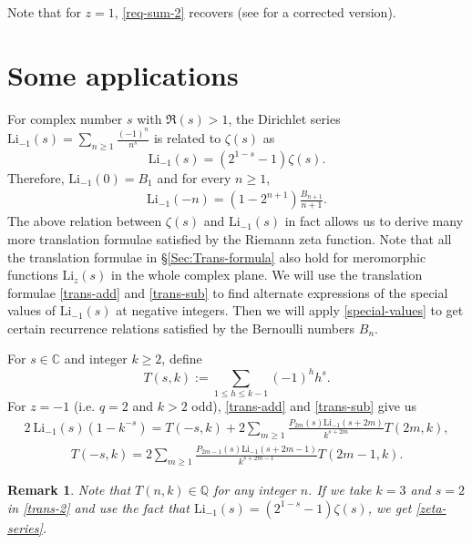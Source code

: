 \documentclass[12pt]{amsart}
\newcommand{\Q}{{\mathbb Q}}
\newcommand{\C}{{\mathbb C}}
\newtheorem{rmk}{Remark}
\begin{document}
Note that for $z=1$, \eqref{req-sum-2} recovers \cite[eq. (15)]{TA} (see \cite[eq. (2.15)]{LOC} for a corrected version).




\section{Some applications}
For complex number $s$ with $\Re(s)>1$, the Dirichlet series  $\mathrm{Li}_{-1}(s)=\sum_{n\ge 1}\frac{(-1)^{n}}{n^s}$ 
is related to $\zeta(s)$ as
 $$
 \mathrm{Li}_{-1}(s)=(2^{1-s}-1)\zeta(s).
 $$
Therefore, $\mathrm{Li}_{-1}(0)=B_1$ and for every $n\geq1$,
\begin{align}\label{special-values}
\mathrm{Li}_{-1}(-n)=(1-2^{n+1})\frac{B_{n+1}}{n+1}.
\end{align}
The above relation between $\zeta(s)$ and $\mathrm{Li}_{-1}(s)$ in fact allows us to derive many more
translation formulae satisfied by the Riemann zeta function.
Note that all the translation formulae in \S\ref{Sec:Trans-formula} also hold for meromorphic functions $\mathrm{Li}_z(s)$ in the whole complex plane.
We will use the translation formulae \eqref{trans-add} and \eqref{trans-sub} to find alternate expressions of the special values of $\mathrm{Li}_{-1}(s)$ at negative 
integers. Then we will apply \eqref{special-values} to get certain recurrence relations satisfied by the Bernoulli numbers $B_n$.

 For $s\in \C$ and integer $k\geq2$, define
 $$
 T(s,k):=\sum_{1\leq h\leq k-1}(-1)^hh^s.
 $$
For $z=-1$ (i.e. $q=2$ and $k>2$ odd), \eqref{trans-add} and \eqref{trans-sub} give us
\begin{align}\label{trans-1}
2 \ \mathrm{Li}_{-1}(s)(1-k^{-s})=T(-s,k)+2\sum_{m\ge1}\frac{P_{2m}(s)
\mathrm{Li}_{-1}(s+2m)}{k^{{s+2m}}}T(2m,k),
\end{align}
\begin{align}\label{trans-2}
T(-s,k)=2\sum_{m\ge1}\frac{P_{2m-1}(s)\mathrm{Li}_{-1}(s+2m-1)}{k^{{s+2m-1}}}T(2m-1,k).
\end{align}

\begin{rmk}\rm
Note that $T(n,k)\in \Q$ for any integer $n$. If we take $k=3$ and $s=2$ in \eqref{trans-2} and use the fact that $\mathrm{Li}_{-1}(s)=(2^{1-s}-1)\zeta(s)$,
we get \eqref{zeta-series}.
\end{rmk}
\end{document}
